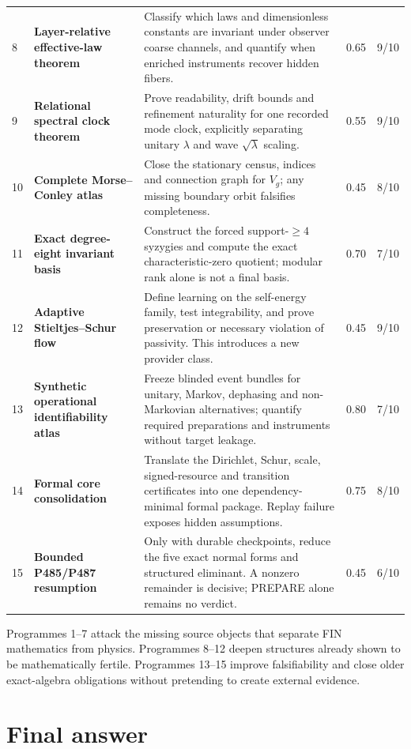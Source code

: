 \documentclass[11pt,a4paper]{article}
\theoremstyle{definition}
\theoremstyle{remark}
\begin{document}
\begin{longtable}{@{}p{}p{}p{}p{}p{}@{}}
8 & \textbf{Layer-relative effective-law theorem} & Classify which laws and dimensionless constants are invariant under observer coarse channels, and quantify when enriched instruments recover hidden fibers. & 0.65 & 9/10\\
9 & \textbf{Relational spectral clock theorem} & Prove readability, drift bounds and refinement naturality for one recorded mode clock, explicitly separating unitary $\lambda$ and wave $\sqrt\lambda$ scaling. & 0.55 & 9/10\\
10 & \textbf{Complete Morse--Conley atlas} & Close the stationary census, indices and connection graph for $V_g$; any missing boundary orbit falsifies completeness. & 0.45 & 8/10\\
11 & \textbf{Exact degree-eight invariant basis} & Construct the forced support-$\ge4$ syzygies and compute the exact characteristic-zero quotient; modular rank alone is not a final basis. & 0.70 & 7/10\\
12 & \textbf{Adaptive Stieltjes--Schur flow} & Define learning on the self-energy family, test integrability, and prove preservation or necessary violation of passivity. This introduces a new provider class. & 0.45 & 9/10\\
13 & \textbf{Synthetic operational identifiability atlas} & Freeze blinded event bundles for unitary, Markov, dephasing and non-Markovian alternatives; quantify required preparations and instruments without target leakage. & 0.80 & 7/10\\
14 & \textbf{Formal core consolidation} & Translate the Dirichlet, Schur, scale, signed-resource and transition certificates into one dependency-minimal formal package. Replay failure exposes hidden assumptions. & 0.75 & 8/10\\
15 & \textbf{Bounded P485/P487 resumption} & Only with durable checkpoints, reduce the five exact normal forms and structured eliminant. A nonzero remainder is decisive; PREPARE alone remains no verdict. & 0.45 & 6/10\\
\bottomrule
\end{longtable}
\normalsize

Programmes 1--7 attack the missing source objects that separate FIN mathematics from physics. Programmes 8--12 deepen structures already shown to be mathematically fertile. Programmes 13--15 improve falsifiability and close older exact-algebra obligations without pretending to create external evidence.

\section{Final answer}
\end{document}
